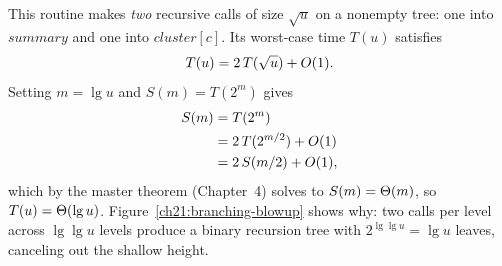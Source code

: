 This routine makes \emph{two} recursive calls of size
$\sqrt{u}$ on a nonempty tree: one into $\mathit{summary}$ and one into $\mathit{cluster}[c]$.
Its worst-case time $T(u)$ satisfies
\[
  T(u) = 2\,T(\sqrt{u}) + O(1).
\]
Setting $m = \lg u$ and $S(m) = T(2^m)$ gives
\begin{align*}
  S(m) &= T(2^m) \\
       &= 2\,T(2^{m/2}) + O(1) \\
       &= 2\,S(m/2) + O(1),
\end{align*}
which by the master theorem (Chapter~4) solves to $S(m) = \Theta(m)$, so $T(u) = \Theta(\lg u)$. Figure~\ref{ch21:branching-blowup} shows why: two calls per level across $\lg\lg u$ levels produce a binary recursion tree with $2^{\lg\lg u} = \lg u$ leaves, canceling out the shallow height.

